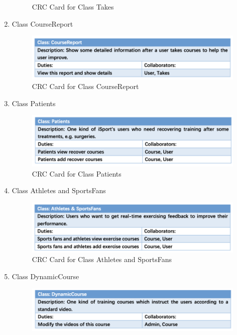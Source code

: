 \documentclass[16pt]{scrreprt}
\begin{document}
\begin{enumerate}
\begin{figure}[H]
			\caption{CRC Card for Class Takes}
			\label{fig:takes}
		\end{figure}
	\item Class CourseReport
		\begin{figure}[H]
			\centering
			\includegraphics[width=1.1\textwidth]{figures/CourseReport.png}
			\caption{CRC Card for Class CourseReport}
			\label{fig:cr}
		\end{figure}
	\item Class Patients
		\begin{figure}[H]
			\centering
			\includegraphics[width=1.1\textwidth]{figures/Patients.png}
			\caption{CRC Card for Class Patients}
			\label{fig:patients}
		\end{figure}
	\item Class Athletes and SportsFans
		\begin{figure}[H]
			\centering
			\includegraphics[width=1.1\textwidth]{figures/AthletesSports.png}
			\caption{CRC Card for Class Athletes and SportsFans}
			\label{fig:a_and_s}
		\end{figure}
	\item Class DynamicCourse
		\begin{figure}[H]
			\centering
			\includegraphics[width=1.1\textwidth]{figures/dynamic.png}

\end{figure}
\end{enumerate}
\end{document}

